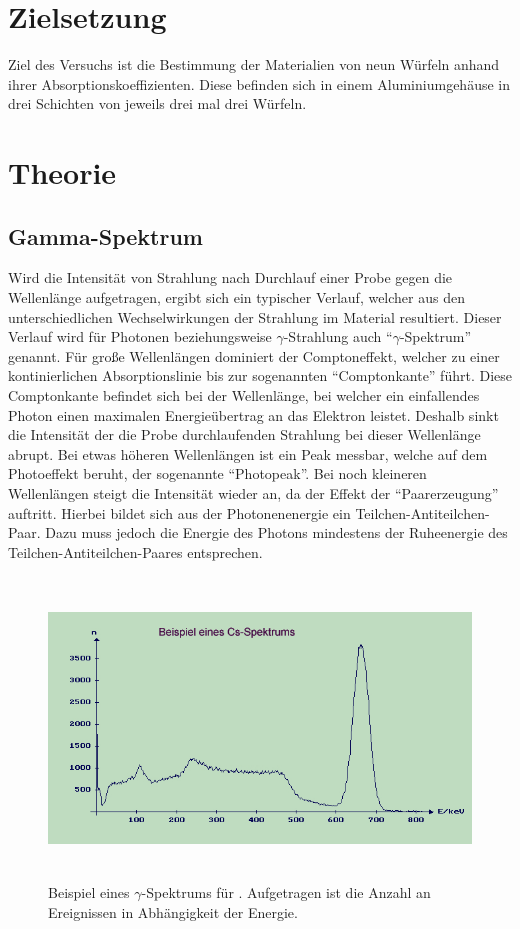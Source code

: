 \section{Zielsetzung}
\label{sec:Zielsetzung}

Ziel des Versuchs ist die Bestimmung der Materialien von neun Würfeln
anhand ihrer Absorptionskoeffizienten.
Diese befinden sich in einem Aluminiumgehäuse in drei Schichten von
jeweils drei mal drei Würfeln.

\section{Theorie}
\label{sec:Theorie}

\subsection{Gamma-Spektrum}
\label{sec:GammaSpektrum}

Wird die Intensität von Strahlung nach Durchlauf einer Probe gegen die Wellenlänge
aufgetragen, ergibt sich ein typischer Verlauf, welcher aus den unterschiedlichen
Wechselwirkungen der Strahlung im Material resultiert.
Dieser Verlauf wird für Photonen beziehungsweise $\gamma$-Strahlung
auch \enquote{$\gamma$-Spektrum} genannt.
Für große Wellenlängen dominiert der Comptoneffekt,
welcher zu einer kontinierlichen Absorptionslinie
bis zur sogenannten \enquote{Comptonkante} führt.
Diese Comptonkante befindet sich bei der Wellenlänge,
bei welcher ein einfallendes Photon einen maximalen
Energieübertrag an das Elektron leistet.
Deshalb sinkt die Intensität der die Probe durchlaufenden Strahlung
bei dieser Wellenlänge abrupt.
Bei etwas höheren Wellenlängen ist ein Peak messbar,
welche auf dem Photoeffekt beruht, der sogenannte \enquote{Photopeak}.
Bei noch kleineren Wellenlängen steigt die Intensität wieder an,
da der Effekt der \enquote{Paarerzeugung} auftritt.
Hierbei bildet sich aus der Photonenenergie ein Teilchen-Antiteilchen-Paar.
Dazu muss jedoch die Energie des Photons mindestens der Ruheenergie
des Teilchen-Antiteilchen-Paares entsprechen.

\begin{figure}
  \centering
  \includegraphics[height=8.0cm]{content/Energiespektrum.jpg}
  \caption{Beispiel eines $\gamma$-Spektrums für  \cite{hans}.
  Aufgetragen ist die Anzahl an Ereignissen in Abhängigkeit der Energie.}
  \label{fig:spektrum}
\end{figure}

